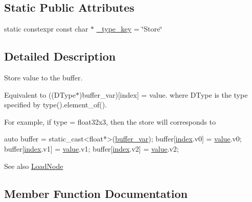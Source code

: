 \subsection*{Static Public Attributes}
\begin{DoxyCompactItemize}
\item 
static constexpr const char $\ast$ \hyperlink{classtvm_1_1tir_1_1StoreNode_aa15540d79868b231397a8ffe1f22cf9f}{\+\_\+type\+\_\+key} = \char`\"{}Store\char`\"{}
\end{DoxyCompactItemize}


\subsection{Detailed Description}
Store value to the buffer. 

Equivalent to ((D\+Type$\ast$)buffer\+\_\+var)\mbox{[}index\mbox{]} = value. where D\+Type is the type specified by type().element\+\_\+of().

For example, if type = float32x3, then the store will corresponds to


\begin{DoxyCode}
\textcolor{keyword}{auto} buffer = \textcolor{keyword}{static\_cast<}\textcolor{keywordtype}{float}*\textcolor{keyword}{>}(\hyperlink{classtvm_1_1tir_1_1StoreNode_aed2fc3d3c119126a61182666930e8729}{buffer\_var});
buffer[\hyperlink{classtvm_1_1tir_1_1StoreNode_adb01cdfb84c4b715cb817dcf49118557}{index}.v0] = \hyperlink{classtvm_1_1tir_1_1StoreNode_ab263339a5ca3f30c5be6498f3db67bc0}{value}.v0;
buffer[\hyperlink{classtvm_1_1tir_1_1StoreNode_adb01cdfb84c4b715cb817dcf49118557}{index}.v1] = \hyperlink{classtvm_1_1tir_1_1StoreNode_ab263339a5ca3f30c5be6498f3db67bc0}{value}.v1;
buffer[\hyperlink{classtvm_1_1tir_1_1StoreNode_adb01cdfb84c4b715cb817dcf49118557}{index}.v2] = \hyperlink{classtvm_1_1tir_1_1StoreNode_ab263339a5ca3f30c5be6498f3db67bc0}{value}.v2;
\end{DoxyCode}
 \begin{DoxySeeAlso}{See also}
\hyperlink{classtvm_1_1tir_1_1LoadNode}{Load\+Node} 
\end{DoxySeeAlso}


\subsection{Member Function Documentation}
